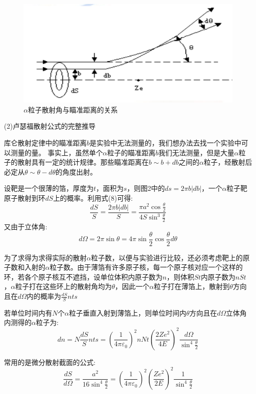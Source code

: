 \documentclass[utf8]{ctexart}
\begin{document}
\begin{figure}
	\centering
	\includegraphics[scale=0.8]{1.2.png}
	\caption{$\alpha$粒子散射角与瞄准距离的关系}
\end{figure}
(2)卢瑟福散射公式的完整推导
\par
库仑散射定律中的瞄准距离$b$是实验中无法测量的，我们想办法去找一个实验中可以测量的量。
事实上，虽然单个$\alpha$粒子的瞄准距离$b$我们无法测量，但是大量$\alpha$粒子的散射具有一定的统计规律。那些瞄准距离在$b\sim b+db$之间的$\alpha$粒子，经散射后必定从$\theta \sim \theta - d\theta$的角度出射。
\par 
设靶是一个很薄的箔，厚度为$t$，面积为$s$，则图2中的$ds = 2\pi b|db|$，一个$\alpha$粒子靶原子散射到环$dS$上的概率。利用式(8)可得:
\begin{equation}
	\frac{dS}{S} = \frac{2\pi b|db|}{S} = \frac{\pi a^2\cos{\frac{\theta}{2}}}{4S\sin^3{\frac{\theta}{2}}}
\end{equation}
又由于立体角:
$$
d\Omega = 2\pi \sin{\theta} = 4\pi \sin{\frac{\theta}{2}}\cos{\frac{\theta}{2}}d\theta
$$

为了求得为求得实际的散射$\alpha$粒子数，以便与实验进行比较，还必须考虑靶上的原子数和入射的$\alpha$粒子数。由于薄箔有许多原子核，每一个原子核对应一个这样的环，若各个原子核互不遮挡，设单位体积内原子数为$n$，则体积$St$内原子数为$nSt$，$\alpha$粒子打在这些环上的散射角均为$\theta$，因此一个$\alpha$粒子打在薄箔上，散射到$\theta$方向且在$d\Omega$内的概率为$\frac{dS}{S}nts$

若单位时间内有$N$个$\alpha$粒子垂直入射到薄箔上，则单位时间内$\theta$方向且在$d\Omega$立体角内测得的$\alpha$粒子为:
\begin{equation}
	dn = N\frac{dS}{S}nts = \left(\frac{1}{4\pi \varepsilon_0}\right)^2nNt\left(\frac{2Ze^2}{4E}\right)^2\frac{d\Omega}{\sin^4{\frac{\theta}{2}}}
\end{equation}

常用的是微分散射截面的公式:
\begin{equation}
	\frac{dS}{d\Omega} = \frac{a^2}{16\sin^4{\frac{\theta}{2}}} = \left(\frac{1}{4\pi \varepsilon_0}\right)^2\left(\frac{Ze^2}{2E}\right)^2\frac{1}{\sin^4{\frac{\theta}{2}}}
\end{equation}
\end{document}
